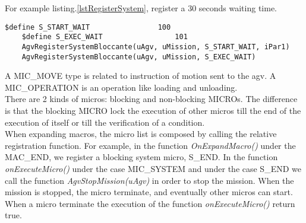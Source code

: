 For example listing.\ref{lstRegisterSystem}, register a 30 seconds waiting time.

\begin{lstlisting}[caption=Wait time system micro ,label=lstRegisterSystem]
	$define S_START_WAIT				100
	$define S_EXEC_WAIT					101
	AgvRegisterSystemBloccante(uAgv, uMission, S_START_WAIT, iPar1)
	AgvRegisterSystemBloccante(uAgv, uMission, S_EXEC_WAIT)
\end{lstlisting}
	

A MIC\_MOVE type is related to instruction of motion sent to the agv. A MIC\_OPERATION is an operation like loading and unloading. \\

There are 2 kinds of micros: blocking and non-blocking MICROs. The difference is that the blocking MICRO lock the execution of other micros till the end of the execution of itself or till the verification of a condition. \\

When expanding macros, the micro list is composed by calling the relative registration function.
For example, in the function \textit{OnExpandMacro()} under the MAC\_END, we register a blocking system micro, S\_END.
In the function \textit{onExecuteMicro()} under the case MIC\_SYSTEM and under the case S\_END we call the function \textit{AgvStopMission(uAgv)} in order to stop the mission.
When the mission is stopped, the micro terminate, and eventually other micros can start. When a micro terminate the execution of the function \textit{onExecuteMicro()} return true. \\


